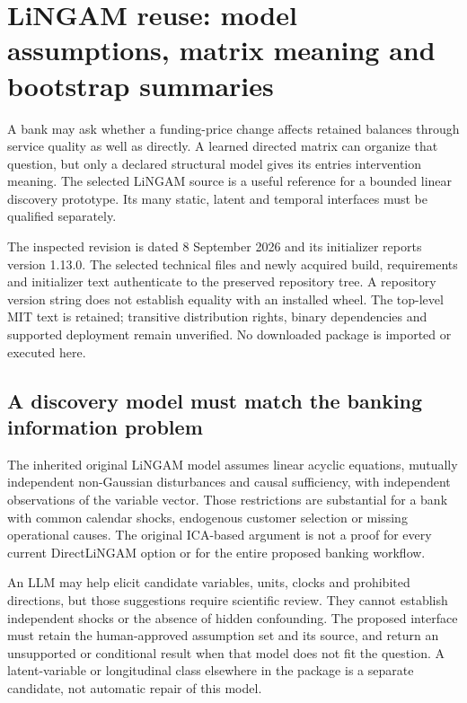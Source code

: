 \section{LiNGAM reuse: model assumptions, matrix meaning and bootstrap summaries}
\label{sec:exec24-lingam-reuse}

A bank may ask whether a funding-price change affects retained balances
through service quality as well as directly. A learned directed matrix
can organize that question, but only a declared structural model gives
its entries intervention meaning. The selected LiNGAM source is a useful
reference for a bounded linear discovery prototype. Its many static,
latent and temporal interfaces must be qualified separately.
\citep{exec24_lingam_source,exec24_lingam_choice}

The inspected revision is dated 8 September 2026 and its initializer
reports version 1.13.0. The selected technical files and newly acquired
build, requirements and initializer text authenticate to the preserved
repository tree. A repository version string does not establish equality
with an installed wheel. The top-level MIT text is retained; transitive
distribution rights, binary dependencies and supported deployment remain
unverified. No downloaded package is imported or executed here.
\citep{exec24_lingam_source}

\subsection{A discovery model must match the banking information problem}
The inherited original LiNGAM model assumes linear acyclic equations,
mutually independent non-Gaussian disturbances and causal sufficiency,
with independent observations of the variable vector. Those restrictions
are substantial for a bank with common calendar shocks, endogenous
customer selection or missing operational causes. The original ICA-based
argument is not a proof for every current DirectLiNGAM option or for the
entire proposed banking workflow.\citep{exec13_pydisc_shimizu2006}

An LLM may help elicit candidate variables, units, clocks and prohibited
directions, but those suggestions require scientific review. They cannot
establish independent shocks or the absence of hidden confounding. The
proposed interface must retain the human-approved assumption set and its
source, and return an unsupported or conditional result when that model
does not fit the question. A latent-variable or longitudinal class elsewhere
in the package is a separate candidate, not automatic repair of this model.
\citep{exec24_lingam_choice}

